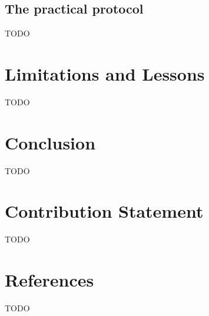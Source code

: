 \documentclass[11pt]{article}
\begin{document}
\subsection{The practical protocol}
TODO

\section{Limitations and Lessons}
TODO

\section{Conclusion}
TODO

\section*{Contribution Statement}
TODO

\section*{References}
TODO
\end{document}
